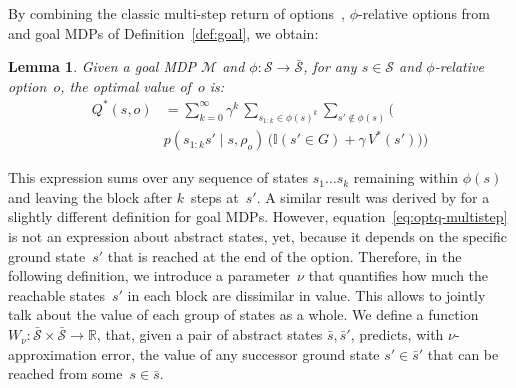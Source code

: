 \documentclass[letterpaper]{article} %
\theoremstyle{plain}
\newtheorem{lemma}{Lemma}
\theoremstyle{definition}
\theoremstyle{remark}
\newcommand{\Reals}{\mathbb{R}}
\newcommand{\Given}{\mid}
\newcommand{\Indicator}{\mathbb{I}}
\newcommand{\SetSym}[1]{\mathcal{#1}}
\newcommand{\Policy}{\rho}
\newcommand{\States}{\SetSym{S}}
\newcommand{\Model}{\SetSym{M}}
\newcommand{\Mapping}{\phi}
\newcommand{\Abst}[1]{\bar{#1}}
\newcommand{\PHomogeneity}{\nu}
\begin{document}
By combining the classic multi-step return of options~\cite{sutton1999between},
$\Mapping$-relative options from~\cite{abel_2020_ValuePreserving} and goal
MDPs of Definition~\ref{def:goal}, we obtain:
\begin{lemma}
    Given a goal MDP $\Model$ and $\Mapping: \States \to \Abst\States$,
    for any $s \in \States$ and $\Mapping$-relative option~$o$, the optimal value of~$o$ is:
    \begin{equation}
        \begin{aligned}
    	Q^*(s, o) &=
        \sum_{k=0}^{\infty} \gamma^k\, \sum_{s_{1:k} \in \Mapping(s)^k} \sum_{s' \not\in \Mapping(s)} \bigl(\\
    	&p(s_{1:k} s' \Given s, \Policy_o)\, \bigl( \Indicator(s' \in G) + \gamma\, V^*(s') \bigr)\bigr)
    	\end{aligned}
    	\label{eq:optq-multistep}
    \end{equation}
		\label{lem:multi-step}
\end{lemma}
This expression sums over any sequence of states ${s_1\dots s_k}$ remaining within $\Mapping(s)$ and leaving the block after $k$~steps at~$s'$.
A similar result was derived by \cite{abel_2020_ValuePreserving} for a slightly different definition for goal MDPs.
%
However, equation~\eqref{eq:optq-multistep} is not an expression about abstract states, yet, because it depends on the specific ground state~$s'$ that is reached at the end of the option.
Therefore, in the following definition, we introduce a parameter~$\PHomogeneity$ that quantifies how much the reachable states~$s'$ in each block are dissimilar in value.
This allows to jointly talk about the value of each group of states as a whole.
We define a function $W_\PHomogeneity: \Abst\States \times \Abst\States \to \Reals$, that, given a pair of abstract states $\Abst{s}, \Abst{s}'$, predicts, with $\PHomogeneity$-approximation error, the value of any successor ground state $s' \in \Abst{s}'$ that can be reached from some~$s \in \Abst{s}$.
\end{document}
